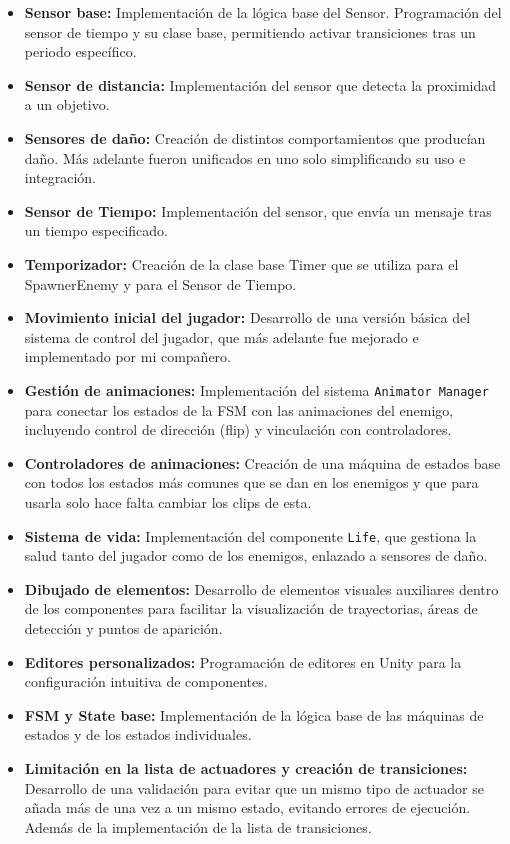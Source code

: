 \begin{itemize}
  \item \textbf{Sensor base:} Implementación de la lógica base del Sensor. Programación del sensor de tiempo y su clase base, permitiendo activar transiciones tras un periodo específico.
  \item \textbf{Sensor de distancia:} Implementación del sensor que detecta la proximidad a un objetivo.
 \item \textbf{Sensores de daño:} Creación de distintos comportamientos que producían daño. Más adelante fueron unificados en uno solo simplificando su uso e integración.
 \item \textbf{Sensor de Tiempo:} Implementación del sensor, que envía un mensaje tras un tiempo especificado.
 \item \textbf{Temporizador:} Creación de la clase base Timer que se utiliza para el SpawnerEnemy y para el Sensor de Tiempo.
  \item \textbf{Movimiento inicial del jugador:} Desarrollo de una versión básica del sistema de control del jugador, que más adelante fue mejorado e implementado por mi compañero.
\item \textbf{Gestión de animaciones:} Implementación del sistema \texttt{Animator Manager} para conectar los estados de la FSM con las animaciones del enemigo, incluyendo control de dirección (flip) y vinculación con controladores.
\item \textbf{Controladores de animaciones:} Creación de una máquina de estados base con todos los estados más comunes que se dan en los enemigos y que para usarla solo hace falta cambiar los clips de esta.
  \item \textbf{Sistema de vida:} Implementación del componente \texttt{Life}, que gestiona la salud tanto del jugador como de los enemigos, enlazado a sensores de daño.
  \item \textbf{Dibujado de elementos:} Desarrollo de elementos visuales auxiliares dentro de los componentes para facilitar la visualización de trayectorias, áreas de detección y puntos de aparición.
  \item \textbf{Editores personalizados:} Programación de editores en Unity para la configuración intuitiva de componentes.
  \item \textbf{FSM y State base:} Implementación de la lógica base de las máquinas de estados y de los estados individuales.
  \item \textbf{Limitación en la lista de actuadores y creación de transiciones:} Desarrollo de una validación para evitar que un mismo tipo de actuador se añada más de una vez a un mismo estado, evitando errores de ejecución. Además de la implementación de la lista de transiciones.

\end{itemize}
